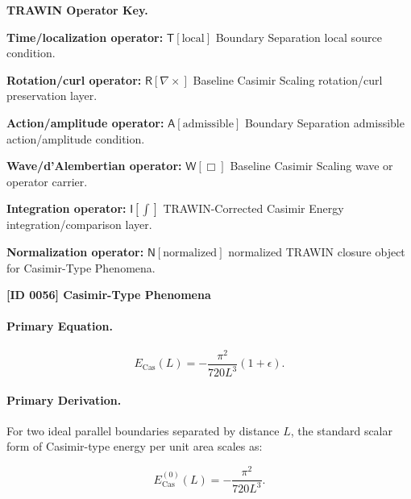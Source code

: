 \par\vspace{0.45\baselineskip}
\noindent\begin{minipage}[t]{\linewidth}
\begingroup
\small
\raggedright
\textbf{TRAWIN Operator Key.}\par
\noindent\textbf{Time/localization operator:} $\mathsf{T}\!\left[\mathrm{local}\right]$ Boundary Separation local source condition.\par
\noindent\textbf{Rotation/curl operator:} $\mathsf{R}\!\left[\nabla\times\right]$ Baseline Casimir Scaling rotation/curl preservation layer.\par
\noindent\textbf{Action/amplitude operator:} $\mathsf{A}\!\left[\mathrm{admissible}\right]$ Boundary Separation admissible action/amplitude condition.\par
\noindent\textbf{Wave/d'Alembertian operator:} $\mathsf{W}\!\left[\Box\right]$ Baseline Casimir Scaling wave or operator carrier.\par
\noindent\textbf{Integration operator:} $\mathsf{I}\!\left[\int\right]$ TRAWIN-Corrected Casimir Energy integration/comparison layer.\par
\noindent\textbf{Normalization operator:} $\mathsf{N}\!\left[\mathrm{normalized}\right]$ normalized TRAWIN closure object for Casimir-Type Phenomena.\par
\endgroup
\end{minipage}

\clearpage
\noindent\textbf{[ID 0056] Casimir-Type Phenomena}\par
\vspace{0.35em}
\paragraph{Primary Equation.}
\begin{equation}
E_{\mathrm{Cas}}(L)
=
-\frac{\pi^2}{720L^3}(1+\epsilon).
\end{equation}

\paragraph{Primary Derivation.}
For two ideal parallel boundaries separated by distance $L$, the standard scalar form of Casimir-type energy per unit area scales as:

\begin{equation}
E_{\mathrm{Cas}}^{(0)}(L)
=
-\frac{\pi^2}{720L^3}.
\end{equation}


